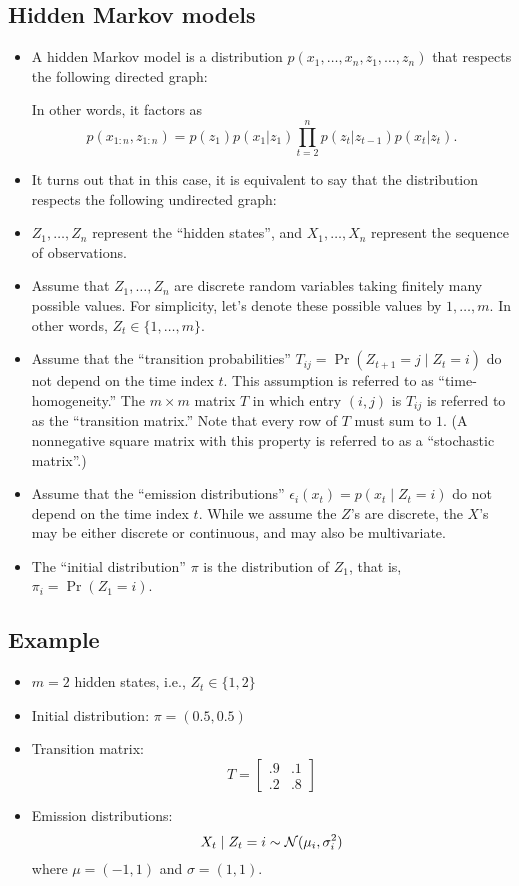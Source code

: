 \documentclass[12pt]{article}
\begin{document}
\subsection{Hidden Markov models}
\begin{itemize}
\item A hidden Markov model is a distribution $p(x_1,\ldots,x_n,z_1,\ldots,z_n)$ that respects the following directed graph:

In other words, it factors as
$$ p(x_{1:n},z_{1:n}) =p(z_1) p(x_1 | z_1) \prod_{t = 2}^n p(z_ t | z_{t -1}) p(x_t | z_t). $$
\item It turns out that in this case, it is equivalent to say that the distribution respects the following undirected graph:

\item $Z_1,\ldots,Z_n$ represent the ``hidden states'', and $X_1,\ldots,X_n$ represent the sequence of observations.
\item Assume that $Z_1,\ldots,Z_n$ are discrete random variables taking finitely many possible values. For simplicity, let's denote these possible values by $1,\ldots,m$. In other words, $Z_t \in \{1,\ldots,m \}$.
\item Assume that the ``transition probabilities'' $T_{i j} = \Pr(Z_{t +1} = j \mid Z_t = i)$ do not depend on the time index $t$. This assumption is referred to as ``time-homogeneity.'' The $m \times m$  matrix $T$ in which entry $(i,j)$ is $T_{i j}$ is referred to as the ``transition matrix.'' Note that every row of $T$ must sum to $1$. (A nonnegative square matrix with this property is referred to as a ``stochastic matrix''.)
\item Assume that the ``emission distributions'' $\epsilon_i(x_t) = p(x_t \mid Z_t = i)$ do not depend on the time index $t$. While we assume the $Z$'s are discrete, the $X$'s may be either discrete or continuous, and may also be multivariate.
\item The ``initial distribution'' $\pi$ is the distribution of $Z_1$, that is, $\pi_i = \Pr(Z_1 = i)$.
\end{itemize}

\subsection{Example}
\begin{itemize}
\item $m = 2$ hidden states, i.e., $Z_t \in \{1,2 \}$
\item Initial distribution: $\pi = (0.5, 0.5)$
\item Transition matrix:
$$ T = \begin{bmatrix}.9 & .1\\.2 & .8 \end{bmatrix} $$
\item Emission distributions: 
$$X_t \mid Z_t = i \sim \mathcal{N}(\mu_i,\sigma_i^2)$$
where $\mu = (-1,1)$ and $\sigma = (1,1)$.
\end{itemize}
\end{document}

